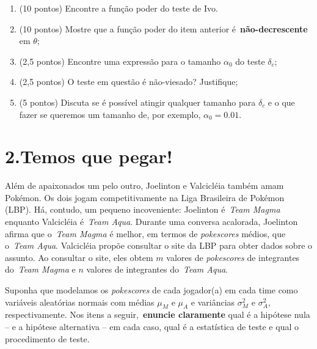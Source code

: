 \documentclass[a4paper,10pt, notitlepage]{report}
\begin{document}
\begin{enumerate}[label=\alph*)]
 \item (10 pontos) Encontre a função poder do teste de Ivo.
 \item (10 pontos) Mostre que a função poder do item anterior é~\textbf{não-decrescente} em $\theta$;
 \item (2,5 pontos) Encontre uma expressão para o tamanho $\alpha_0$ do teste $\delta_c$;
 \item (2,5 pontos) O teste em questão é não-viesado? Justifique;
 \item (5 pontos) Discuta se é possível atingir qualquer tamanho para $\delta_c$ e o que fazer se queremos um tamanho de, por exemplo, $\alpha_0 = 0.01$.
\end{enumerate}

\section*{2.Temos que pegar!}

Além de apaixonados um pelo outro, Joelinton e Valcicléia também amam Pokémon.
Os dois jogam competitivamente na Liga Brasileira de Pokémon (LBP).
Há, contudo, um pequeno incoveniente:  Joelinton é~\textit{Team Magma} enquanto Valcicléia é~\textit{Team Aqua}.
Durante uma conversa acalorada, Joelinton afirma que o~\textit{Team Magma} é melhor, em termos de \textit{pokescores} médios, que o~\textit{Team Aqua}.
Valcicléia propõe consultar o site da LBP para obter dados sobre o assunto.
Ao consultar o site, eles obtem $m$ valores de \textit{pokescores} de integrantes do~\textit{Team Magma} e $n$ valores de integrantes do~\textit{Team Aqua}.

Suponha que modelamos os \textit{pokescores} de cada jogador(a) em cada time como variáveis aleatórias normais com médias $\mu_{M}$ e $\mu_{A}$ e variâncias $\sigma_{M}^2$ e $\sigma_{A}^2$, respectivamente.
Nos itens a seguir,~\textbf{enuncie claramente} qual é a hipótese nula -- e a hipótese alternativa -- em cada caso, qual é a estatística de teste e qual o procedimento de teste.
\end{document}
